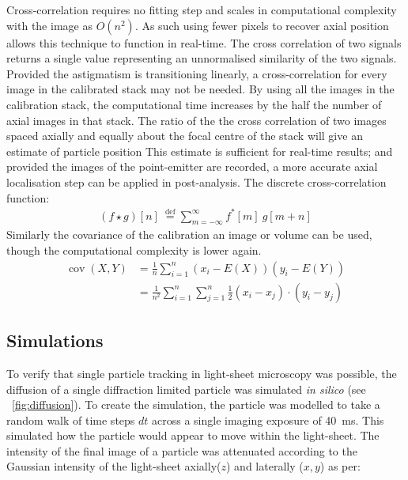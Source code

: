 Cross-correlation requires no fitting step and scales in computational complexity with the image as $O(n^2)$. %
As such using fewer pixels%
to recover axial position allows this technique to function in real-time.
The cross correlation of two signals returns a single value representing an unnormalised similarity of the two signals.
Provided the astigmatism is transitioning linearly, a cross-correlation for every image in the calibrated stack may not be needed.
By using all the images in the calibration stack, the computational time increases by the half the number of axial images in that stack.
The ratio of the the cross correlation of two images spaced axially and equally about the focal centre of the stack will give an estimate of particle position
This estimate is sufficient for real-time results; and provided the images of the point-emitter are recorded, a more accurate axial localisation step can be applied in post-analysis.
The discrete cross-correlation function:
\begin{align}
(f \star g)[n]\ \stackrel{\mathrm{def}}{=} \sum_{m=-\infty}^{\infty} f^*[m]\ g[m+n]
\end{align}
Similarly the covariance of the calibration an image or volume can be used, though the computational complexity is lower again.
\begin{align}
  \operatorname{cov}(X,Y) &=\frac{1}{n}\sum_{i=1}^n (x_i-E(X))(y_i-E(Y)) \\
 &= \frac{1}{n^2} \sum_{i=1}^n \sum_{j=1}^n \frac{1}{2}(x_i - x_j)\cdot(y_i - y_j)
\end{align}

\subsection{Simulations}
To verify that single particle tracking in light-sheet microscopy was possible, the diffusion of a single diffraction limited particle was simulated \emph{in silico} (see \figurename~\ref{fig:diffusion}).
To create the simulation, the particle was modelled to take a random walk of time steps $dt$ across a single imaging exposure of \SI{40}{\milli\second}.
This simulated how the particle would appear to move within the light-sheet.
The intensity of the final image of a particle was attenuated according to the Gaussian intensity of the light-sheet axially($z$) and laterally ($x,y$) as per:

